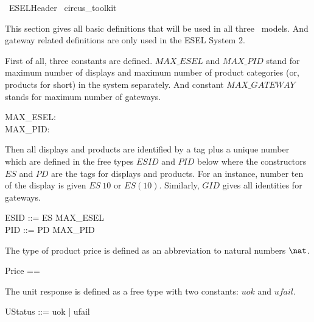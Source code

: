 \begin{zsection}
	\SECTION\ ESELHeader \parents\ circus\_toolkit
\end{zsection}

This section gives all basic definitions that will be used in all three \Circus\ models. And gateway related definitions are only used in the ESEL System 2.

First of all, three constants are defined. $MAX\_ESEL$ and $MAX\_PID$ stand for maximum number of displays and maximum number of product categories (or, products for short) in the system separately. And constant $MAX\_GATEWAY$ stands for maximum number of gateways.
\begin{axdef}
    MAX\_ESEL: \nat \\
    MAX\_PID: \nat \\
\end{axdef}

Then all displays and products are identified by a tag plus a unique number which are defined in the free types $ESID$ and $PID$ below where the constructors $ES$ and $PD$ are the tags for displays and products. For an instance, number ten of the display is given $ES~10$ or $ES(10)$. Similarly, $GID$ gives all identities for gateways.
\begin{zed}
    ESID ::= ES  \upto MAX\_ESEL \rdata \\
    PID ::= PD  \upto MAX\_PID \rdata \\
\end{zed}


The type of product price is defined as an abbreviation to natural numbers $\nat$.
\begin{zed}
    Price == \nat
\end{zed}

The unit response is defined as a free type with two constants: $uok$ and $ufail$.
\begin{zed}
    UStatus ::= uok | ufail
\end{zed}

